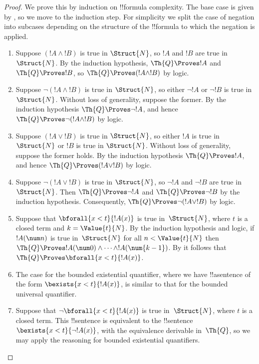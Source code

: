 \documentclass[../../../include/open-logic-section]{subfiles}
\begin{document}
\begin{proof}
We prove this by induction on !!{formula} complexity.
%
The base case is given by ,
so we move to the induction step. For simplicity we split
the case of negation into subcases depending on the
structure of the !!{formula} to which the negation is
applied.

\begin{enumerate}
\item Suppose $(!A \land !B)$ is true in $\Struct{N}$,
so $!A$ and $!B$ are true in~$\Struct{N}$.
By the induction hypothesis, $\Th{Q} \Proves !A$ and
$\Th{Q} \Proves !B$,
so $\Th{Q} \Proves (!A \land !B)$ by logic.
%
\item Suppose $\lnot (!A \land !B)$ is true in $\Struct{N}$,
so either $\lnot !A$ or $\lnot !B$ is true in $\Struct{N}$.
Without loss of generality, suppose the former. By the
induction hypothesis $\Th{Q} \Proves \lnot !A$, and hence
$\Th{Q} \Proves \lnot (!A \land !B)$ by logic.
%
\item Suppose $(!A \lor !B)$ is true in $\Struct{N}$, so
either $!A$ is true in $\Struct{N}$ or $!B$ is true in
$\Struct{N}$. Without loss of generality, suppose the former
holds. By the induction hypothesis $\Th{Q} \Proves !A$, and
hence $\Th{Q} \Proves (!A \lor !B)$ by logic.
%
\item Suppose $\lnot(!A \lor !B)$ is true in $\Struct{N}$,
so $\lnot !A$ and $\lnot !B$ are true in $\Struct{N}$.
Then $\Th{Q} \Proves \lnot !A$ and $\Th{Q} \Proves \lnot !B$
by the induction hypothesis. Consequently,
$\Th{Q} \Proves \lnot(!A \lor !B)$ by logic.
%
\item Suppose that $\bforall{x<t}{!A(x)}$ is true 
in~$\Struct{N}$, where $t$ is a closed term and $k=\Value{t}{N}$. By the induction
hypothesis and logic, if $!A(\num n)$ is true in~$\Struct{N}$
for all $n < \Value{t}{N}$ then $\Th{Q} \Proves
!A(\num 0) \land \dots \land !A(\num{k-1})$.
By  it follows that
$\Th{Q} \Proves \bforall{x<t}{!A(x)}$.
%
\item The case for the bounded existential quantifier, where
we have !!a{sentence} of the form $\bexists{x < t}{!A(x)}$,
is similar to that for the bounded universal quantifier.
%
\item Suppose that $\lnot \bforall{x<t}{!A(x)}$ is true 
in~$\Struct{N}$, where $t$ is a closed term. This !!{sentence}
is equivalent to the !!{sentence} $\bexists{x<t}{\lnot !A(x)}$,
with the equivalence derivable in~$\Th{Q}$, so we may apply
the reasoning for bounded existential quantifiers.

\end{enumerate}
\end{proof}
\end{document}
